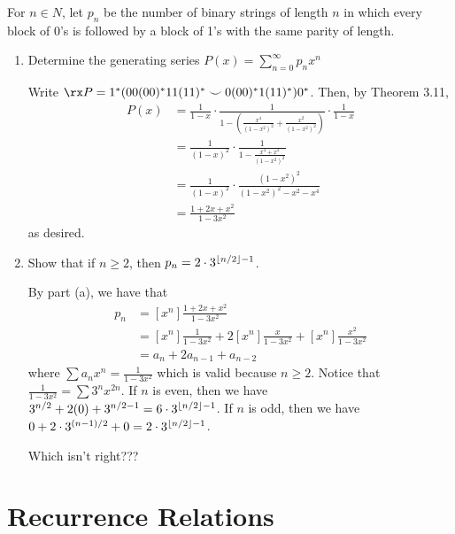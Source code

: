 \documentclass[class=math239,notes,tikz]{agony}
\begin{document}
\begin{xca}
  For $n \in N$, let $p_n$ be the number of binary strings of length $n$
  in which every block of 0's is followed by a block of 1's with the same parity of length.
\end{xca}
\begin{enumerate}
  \item Determine the generating series $P(x) = \sum_{n=0}^\infty p_n x^n$
        \begin{sol}
          Write $\rx P = 1^*(00(00)^*11(11)^* \smile 0(00)^*1(11)^*)0^*$.
          Then, by Theorem 3.11,
          \begin{align*}
            P(x)
             & = \frac{1}{1-x}\cdot\frac{1}{1-(\frac{x^4}{(1-x^2)^2} + \frac{x^2}{(1-x^2)^2})}\cdot\frac{1}{1-x} \\
             & = \frac{1}{(1-x)^2}\cdot\frac{1}{1-\frac{x^4+x^2}{(1-x^2)^2}}                                     \\
             & = \frac{1}{(1-x)^2}\cdot\frac{(1-x^2)^2}{(1-x^2)^2-x^2-x^4}                                       \\
             & = \frac{1+2x+x^2}{1-3x^2}
          \end{align*}
          as desired.
        \end{sol}
  \item Show that if $n \geq 2$, then $p_n = 2\cdot 3^{\lfloor n/2\rfloor-1}$.
        \begin{sol}
          By part (a), we have that
          \begin{align*}
            p_n
             & = [x^n] \frac{1+2x+x^2}{1-3x^2}                                              \\
             & = [x^n] \frac{1}{1-3x^2} + 2[x^n] \frac{x}{1-3x^2} + [x^n]\frac{x^2}{1-3x^2} \\
             & = a_n + 2a_{n-1} + a_{n-2}
          \end{align*}
          where $\sum a_n x^n = \frac{1}{1-3x^2}$ which is valid because $n \geq 2$.
          Notice that $\frac{1}{1-3x^2} = \sum 3^n x^{2n}$.
          If $n$ is even, then we have $3^{n/2}+ 2(0) + 3^{n/2-1} = 6\cdot 3^{\lfloor n/2\rfloor-1}$.
          If $n$ is odd, then we have $0 + 2\cdot 3^{(n-1)/2} + 0 = 2\cdot 3^{\lfloor n/2\rfloor-1}$.

          Which isn't right???
        \end{sol}
\end{enumerate}

\section{Recurrence Relations}
\end{document}
